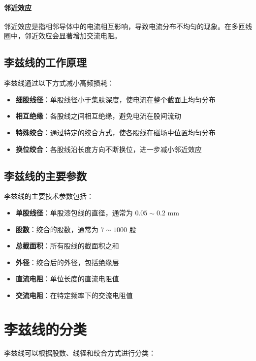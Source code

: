 \documentclass[12pt,UTF8]{ctexbook}
\begin{document}
\paragraph{邻近效应}

邻近效应是指相邻导体中的电流相互影响，导致电流分布不均匀的现象。在多匝线圈中，邻近效应会显著增加交流电阻。

\subsection{李兹线的工作原理}

李兹线通过以下方式减小高频损耗：

\begin{itemize}[leftmargin=2cm]
    \item \textbf{细股线径}：单股线径小于集肤深度，使电流在整个截面上均匀分布
    \item \textbf{相互绝缘}：各股线之间相互绝缘，避免电流在股间流动
    \item \textbf{特殊绞合}：通过特定的绞合方式，使各股线在磁场中位置均匀分布
    \item \textbf{换位绞合}：各股线沿长度方向不断换位，进一步减小邻近效应
\end{itemize}

\subsection{李兹线的主要参数}

李兹线的主要技术参数包括：

\begin{itemize}[leftmargin=2cm]
    \item \textbf{单股线径}：单股漆包线的直径，通常为 $0.05 \sim 0.2$ mm
    \item \textbf{股数}：绞合的股数，通常为 $7 \sim 1000$ 股
    \item \textbf{总截面积}：所有股线的截面积之和
    \item \textbf{外径}：绞合后的外径，包括绝缘层
    \item \textbf{直流电阻}：单位长度的直流电阻值
    \item \textbf{交流电阻}：在特定频率下的交流电阻值
\end{itemize}

\section{李兹线的分类}

李兹线可以根据股数、线径和绞合方式进行分类：
\end{document}
